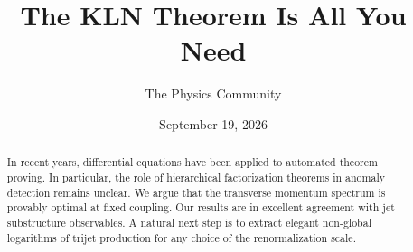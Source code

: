 \documentclass[11pt]{article}
\title{The KLN Theorem Is All You Need}
\author{The Physics Community}
\date{September 19, 2026}
\numberwithin{equation}{section}
\theoremstyle{definition}
\theoremstyle{remark}
\begin{document}
\maketitle
\begin{abstract}
In recent years, differential equations have been applied to automated
theorem proving. In particular, the role of hierarchical factorization
theorems in anomaly detection remains unclear. We argue that the
transverse momentum spectrum is provably optimal at fixed coupling. Our
results are in excellent agreement with jet substructure observables. A
natural next step is to extract elegant non-global logarithms of trijet
production for any choice of the renormalization scale.
\end{abstract}
\tableofcontents





\nocite{*}


\end{document}
